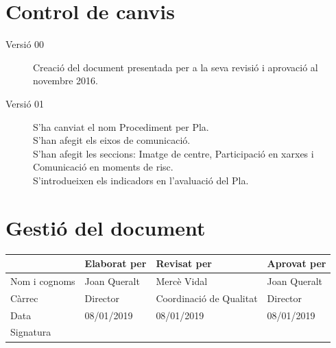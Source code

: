 \documentclass[fontsize=10pt,%
paper=a4,%
DIV=14,%
pagesize=auto,%
parskip=half,
captions=tableheading,%
numbers=noenddot,%
toc=graduated%
]{scrartcl}
\renewcommand{\arraystretch}{1.75}%
\renewcommand{\arraystretch}{1.75}%
\begin{document}

\section{Control de canvis}

\begin{description}
\item[Versió 00] Creació del document presentada per a la seva revisió i aprovació al novembre 2016.
\item[Versió 01] S'ha canviat el nom Procediment per Pla.\\ S'han afegit els eixos de comunicació.\\ S'han afegit les seccions: Imatge de centre, Participació en xarxes i Comunicació en moments de risc.\\ S'introdueixen els indicadors en l'avaluació del Pla.
\end{description}





\section{Gestió del document}\label{sec:gestiodoc}


\begin{center}\scriptsize\sffamily
\renewcommand{\arraystretch}{1.75}%
\begin{tabular}{lllp{4cm}}\hline
              & Elaborat per & Revisat per             & Aprovat per  \\ \hline
Nom i cognoms & Joan Queralt & Mercè Vidal             & Joan Queralt \\
Càrrec        & Director     & Coordinació de Qualitat & Director     \\
Data          & 08/01/2019   & 08/01/2019              & 08/01/2019   \\\hline
Signatura     &              &                         &
\end{tabular}
\end{center}
\end{document}
